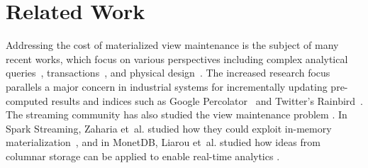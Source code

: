\vspace{-.75em}
\section{Related Work}\label{related}
\vspace{-.25em}
Addressing the cost of materialized view maintenance is the subject of many recent works, which
focus on various perspectives including complex analytical queries~\cite{nikolic2014linview}, transactions~\cite{bailis2014scalable}, and physical design~\cite{lefevre2014opportunistic}.
The increased research focus parallels a major concern in industrial systems for incrementally updating pre-computed results and indices such as Google Percolator~\cite{percolator} and Twitter's Rainbird~\cite{rainbird}.
The streaming community has also studied the view maintenance problem \cite{abadi2003aurora,golab2011consistency, golab2012scalable, he2010comet, ghanem2010supporting, KrishnamurthyFDFGLT10}. In Spark Streaming, Zaharia et~al. studied how they could exploit in-memory materialization~\cite{zaharia2012discretized}, and in MonetDB, Liarou et~al. studied how ideas from columnar storage can be applied to enable real-time analytics \cite{liarou2012monetdb}.


